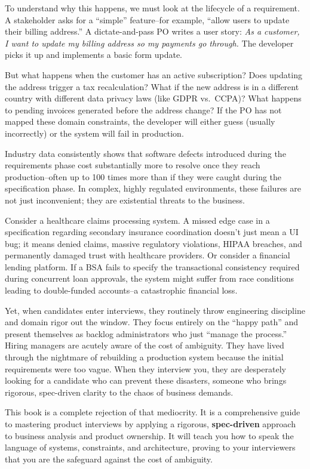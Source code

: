 \documentclass[
  11pt,
  openany,
  oneside]{book}
\begin{document}
To understand why this happens, we must look at the lifecycle of a
requirement. A stakeholder asks for a ``simple'' feature--for example,
``allow users to update their billing address.'' A dictate-and-pass PO
writes a user story: \emph{As a customer, I want to update my billing
address so my payments go through.} The developer picks it up and
implements a basic form update.

But what happens when the customer has an active subscription? Does
updating the address trigger a tax recalculation? What if the new
address is in a different country with different data privacy laws (like
GDPR vs.~CCPA)? What happens to pending invoices generated before the
address change? If the PO has not mapped these domain constraints, the
developer will either guess (usually incorrectly) or the system will
fail in production.

Industry data consistently shows that software defects introduced during
the requirements phase cost substantially more to resolve once they
reach production--often up to 100 times more than if they were caught
during the specification phase. In complex, highly regulated
environments, these failures are not just inconvenient; they are
existential threats to the business.

Consider a healthcare claims processing system. A missed edge case in a
specification regarding secondary insurance coordination doesn't just
mean a UI bug; it means denied claims, massive regulatory violations,
HIPAA breaches, and permanently damaged trust with healthcare providers.
Or consider a financial lending platform. If a BSA fails to specify the
transactional consistency required during concurrent loan approvals, the
system might suffer from race conditions leading to double-funded
accounts--a catastrophic financial loss.

Yet, when candidates enter interviews, they routinely throw engineering
discipline and domain rigor out the window. They focus entirely on the
``happy path'' and present themselves as backlog administrators who just
``manage the process.'' Hiring managers are acutely aware of the cost of
ambiguity. They have lived through the nightmare of rebuilding a
production system because the initial requirements were too vague. When
they interview you, they are desperately looking for a candidate who can
prevent these disasters, someone who brings rigorous, spec-driven
clarity to the chaos of business demands.

This book is a complete rejection of that mediocrity. It is a
comprehensive guide to mastering product interviews by applying a
rigorous, \textbf{spec-driven} approach to business analysis and product
ownership. It will teach you how to speak the language of systems,
constraints, and architecture, proving to your interviewers that you are
the safeguard against the cost of ambiguity.
\end{document}
